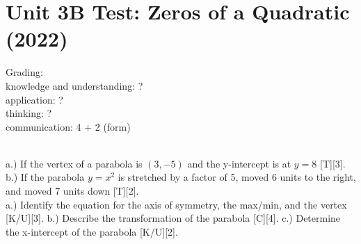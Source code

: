 \documentclass{article}
\begin{document}
\section*{Unit 3B Test: Zeros of a Quadratic (2022)}
Grading:\\
knowledge and understanding: ?\\
application: ?\\
thinking: ?\\
communication: 4 + 2 (form)\\

\vskip 1cm

\vskip 3cm
\\

a.) If the vertex of a parabola is $(3,-5)$ and the y-intercept is at $y=8$ [T][3].
\vskip 3cm
b.) If the parabola $y=x^2$ is stretched by a factor of 5, moved 6 units to the right, and moved 7 units down [T][2]. 
\vskip 3cm
\newpage
{}
\vskip 9.5cm
\\

a.) Identify the equation for the axis of symmetry, the max/min, and the vertex [K/U][3].
\vskip 3.5cm
b.) Describe the transformation of the parabola [C][4].
\vskip 3.5cm
c.) Determine the x-intercept of the parabola [K/U][2].
\end{document}
